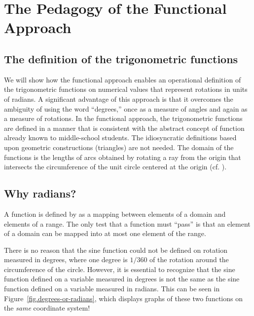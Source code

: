 
\chapter{The Pedagogy of the Functional Approach}\label{ch.pedagogy}

\section{The definition of the trigonometric functions}

We will show how the functional approach enables an operational definition of the  trigonometric functions on numerical values that represent rotations in units of radians.
A significant advantage of this approach is that it overcomes the ambiguity of using the word ``degrees,'' once as a measure of angles and again as a measure of rotations.
In the functional approach, the trigonometric functions are defined in a manner that is consistent with the abstract concept of function already known to middle-school students. The idiosyncratic definitions based upon geometric constructions (triangles) are not needed. The domain of the functions is the lengths of arcs obtained by rotating a ray from the origin that intersects the circumference of the unit circle centered at the origin (cf. \cite{moore}).

\section{Why radians?}

A function is defined by as a mapping between elements of a domain and elements of a range. The only test that a function must ``pass'' is that an element of a domain can be mapped into at most one element of the range.

There is no reason that the sine function could not be defined on rotation measured in degrees, where one degree is $1/360$ of the rotation around the circumference of the circle. However, it is essential to recognize that the sine function defined on a variable measured in degrees is not the same as the sine function defined on a variable measured in radians. This can be seen in 
Figure~\ref{fig.degrees-or-radians}, which displays graphs of these two functions on the \emph{same} coordinate system!


